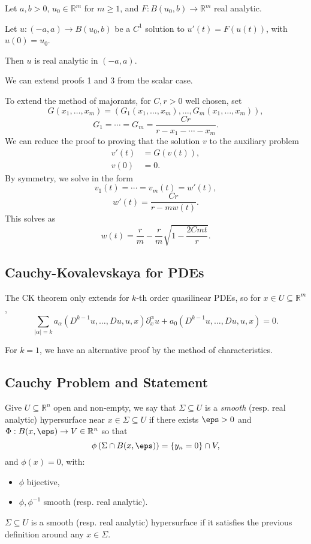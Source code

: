 \documentclass[12pt]{article}
\begin{document}

\begin{theorem}
	Let $a, b > 0$, $u_0 \in \mathbb{R}^m$ for $m \geq 1$, and $F : B(u_0, b) \to \mathbb{R}^m$ real analytic.

	Let $u : (-a, a) \to B(u_0, b)$ be a $C^1$ solution to $u'(t) = F(u(t))$, with $u(0) = u_0$.

	Then $u$ is real analytic in $(-a, a)$.
\end{theorem}

\begin{proofbox}
	We can extend proofs 1 and 3 from the scalar case.

	To extend the method of majorants, for $C, r > 0$ well chosen, set
	\[
	G(x_1, \ldots, x_m) = (G_1(x_1, \ldots, x_m), \ldots, G_m(x_1, \ldots, x_m)),
	\]
	\[
	G_1 = \cdots = G_m = \frac{Cr}{r - x_1 - \cdots - x_m}.
	\]
	We can reduce the proof to proving that the solution $v$ to the auxiliary problem
	\begin{align*}
		v'(t) &= G(v(t)),\\
		v(0) &= 0.
	\end{align*}
	By symmetry, we solve in the form
	\[
	v_1(t) = \cdots = v_m(t) = w'(t),
	\]
	\[
	w'(t) = \frac{Cr}{r - m w(t)}.
	\]
	This solves as
	\[
		w(t) = \frac{r}{m} - \frac{r}{m} \sqrt{1 - \frac{2 C m t}{r}}.
	\]
\end{proofbox}

\subsection{Cauchy-Kovalevskaya for PDEs}%
\label{sub:ck_pde}

The CK theorem only extends for $k$-th order quasilinear PDEs, so for $x \in U \subseteq \mathbb{R}^m$,
\[
\sum_{|\alpha| = k} a_\alpha (D^{k-1} u, \ldots, Du, u, x) \partial^\alpha_x u + a_0 (D^{k-1} u, \ldots, Du, u, x) = 0.
\]
\begin{remark}
	For $k = 1$, we have an alternative proof by the method of characteristics.
\end{remark}

\subsection{Cauchy Problem and Statement}%
\label{sub:cp_s}

\begin{definition}
	Give $U \subseteq \mathbb{R}^n$ open and non-empty, we say that $\Sigma \subseteq U$ is a \emph{smooth} (resp. real analytic) hypersurface near $x \in \Sigma \subseteq U$ if there exists $\eps > 0$ and $\Phi : B(x, \eps) \to V \in \mathbb{R}^n$ so that
	\[
		\phi\left( \Sigma \cap B(x, \eps) \right) = \{y_n = 0\} \cap V,
	\]
	and $\phi(x) = 0$, with:
	\begin{itemize}
		\item $\phi$ bijective,
		\item $\phi, \phi^{-1}$ smooth (resp. real analytic).
	\end{itemize}
	$\Sigma \subseteq U$ is a smooth (resp. real analytic) hypersurface if it satisfies the previous definition around any $x \in \Sigma$.
\end{definition}
\end{document}

